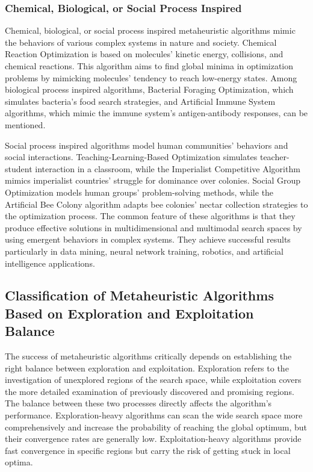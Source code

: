 \subsubsection{Chemical, Biological, or Social Process Inspired}

Chemical, biological, or social process inspired metaheuristic algorithms mimic the behaviors of various complex systems in nature and society. Chemical Reaction Optimization is based on molecules' kinetic energy, collisions, and chemical reactions. This algorithm aims to find global minima in optimization problems by mimicking molecules' tendency to reach low-energy states. Among biological process inspired algorithms, Bacterial Foraging Optimization, which simulates bacteria's food search strategies, and Artificial Immune System algorithms, which mimic the immune system's antigen-antibody responses, can be mentioned.

Social process inspired algorithms model human communities' behaviors and social interactions. Teaching-Learning-Based Optimization simulates teacher-student interaction in a classroom, while the Imperialist Competitive Algorithm mimics imperialist countries' struggle for dominance over colonies. Social Group Optimization models human groups' problem-solving methods, while the Artificial Bee Colony algorithm adapts bee colonies' nectar collection strategies to the optimization process. The common feature of these algorithms is that they produce effective solutions in multidimensional and multimodal search spaces by using emergent behaviors in complex systems. They achieve successful results particularly in data mining, neural network training, robotics, and artificial intelligence applications.

\subsection{Classification of Metaheuristic Algorithms Based on Exploration and Exploitation Balance}

The success of metaheuristic algorithms critically depends on establishing the right balance between exploration and exploitation. Exploration refers to the investigation of unexplored regions of the search space, while exploitation covers the more detailed examination of previously discovered and promising regions. The balance between these two processes directly affects the algorithm's performance. Exploration-heavy algorithms can scan the wide search space more comprehensively and increase the probability of reaching the global optimum, but their convergence rates are generally low. Exploitation-heavy algorithms provide fast convergence in specific regions but carry the risk of getting stuck in local optima.

